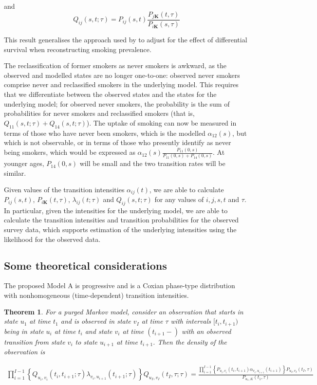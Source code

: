 \documentclass[11pt,a4paper]{article}
\newtheorem{theorem}{Theorem}
\newcommand{\K}{\ensuremath{\bm{K}}}
\begin{document}
\noindent and
\[Q_{ij}(s,t;\tau)=P_{ij}(s,t)\frac{P_{j\K}(t,\tau)}{P_{i\K}(s,\tau)}
\]

This result generalises the approach used by
\citet{harris_cigarette_1983} to adjust for the effect of differential
survival when reconstructing smoking prevalence.

The reclassification of former smokers as never smokers is awkward, as the observed and modelled states are no longer one-to-one: observed never smokers comprise never and reclassified smokers in the underlying model. This requires that we differentiate between the observed states and the states for the underlying model; for observed never smokers, the probability is the sum of probabilities for never smokers and reclassified smokers (that is, $Q_{11}(s,t;\tau)+Q_{14}(s,t;\tau)$). The uptake of smoking can now be measured in terms of those who have never been smokers, which is the modelled $\alpha_{12}(s)$, but which is not observable, or in terms of those who presently identify as never being smokers, which would be expressed as $\alpha_{12}(s)\frac{P_{11}(0,s)}{P_{11}(0,s)+P_{14}(0,s)}$. At younger ages, $P_{14}(0,s)$ will be small and the two transition rates will be similar.

Given values of the transition intensities $\alpha_{ij}(t)$, we are
able to calculate $P_{ij}(s,t)$, $P_{i\K}(t,\tau)$,
$\lambda_{ij}(t;\tau)$ and $Q_{ij}(s,t;\tau)$ for any values of
$i,j,s,t$ and $\tau$.  In particular, given the intensities for the
underlying model, we are able to calculate the transition intensities
and transition probabilities for the observed survey data, which supports estimation of the underlying intensities using the likelihood for the observed data.

\subsection{Some theoretical considerations}

The proposed Model A is progressive and is a Coxian phase-type distribution with nonhomogeneous (time-dependent) transition intensities.

\begin{theorem}
For a purged Markov model, consider an observation that starts in state $u_1$ at time $t_1$ and is observed in state $v_I$ at time $\tau$ with intervals $[t_i,t_{i+1})$ being in state $u_i$ at time $t_i$ and state $v_i$ at time $(t_{i+1}-)$ with an observed transition from state $v_i$ to state $u_{i+1}$ at time $t_{i+1}$. Then the density of the observation is

\begin{align*} 
\prod_{i=1}^{I-1} \left\{Q_{u_i,v_i}(t_i,t_{i+1};\tau) \lambda_{v_i,u_{i+1}}(t_{i+1};\tau)\right\}Q_{u_I,v_I}(t_I,\tau;\tau)
= \frac{\prod_{i=1}^{I-1} \left\{P_{u_i,v_i}(t_i,t_{i+1}) \alpha_{v_i,u_{i+1}}(t_{i+1})\right\}P_{u_I,v_I}(t_I,\tau)}{P_{u_1,K}(t_1,\tau)}
\end{align*}
\end{theorem}
\end{document}
